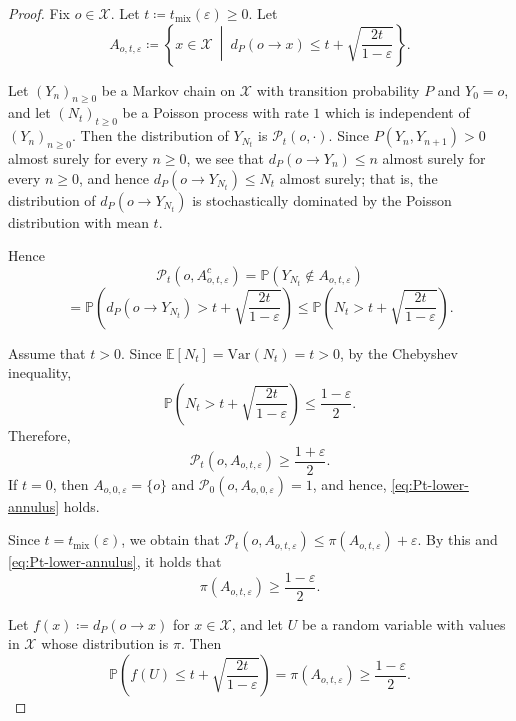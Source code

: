 \documentclass[10pt,a4paper]{amsart}
\theoremstyle{plain}
\theoremstyle{definition}
\begin{document}
\begin{proof}
Fix $o \in \mathcal{X}$. 
Let $t \coloneqq t_{\mathrm{mix}}(\varepsilon) \ge 0$. 
Let
\[ A_{o,t,\varepsilon} \coloneqq \left\{x\in\mathcal{X}\ \middle|\ d_P (o \to x) \le t+\sqrt{\frac{2t}{1-\varepsilon}}\right\}. \]

Let $(Y_n)_{n \ge 0}$ be a Markov chain on $\mathcal{X}$ with transition probability $P$ and $Y_0 = o$,
and let $(N_t)_{t \ge 0}$ be a Poisson process with rate $1$ which is independent of $(Y_n)_{n \ge 0}$.
Then the distribution of $Y_{N_t}$ is $\mathscr{P}_t (o, \cdot)$.
Since $P(Y_{n}, Y_{n+1}) > 0$ almost surely for every $n \ge 0$, we see that $d_P (o \to Y_n) \le n$ almost surely for every $n \ge 0$,
and hence $d_P (o \to Y_{N_t}) \le N_t$ almost surely;
that is, the distribution of $d_P (o \to Y_{N_t})$ is stochastically dominated by the Poisson distribution with mean $t$.

Hence
\[ \mathscr{P}_t\left(o, A_{o,t,\varepsilon}^c\right) = \mathbb{P} \left(Y_{N_t} \notin A_{o,t,\varepsilon}\right) \]
\[ = \mathbb{P} \!\left(d_P (o \to Y_{N_t}) > t+\sqrt{\frac{2t}{1-\varepsilon}}\right) \le \mathbb{P}\!\left(N_t >  t+\sqrt{\frac{2t}{1-\varepsilon}}\right). \]

Assume that $t > 0$. 
Since $\mathbb{E}[N_t] = \mathrm{Var}(N_t) = t > 0$, by the Chebyshev inequality,
\[ \mathbb{P}\!\left(N_t > t+\sqrt{\frac{2t}{1-\varepsilon}}\right) \le  \frac{1-\varepsilon}{2}. \]
Therefore, 
\begin{equation}\label{eq:Pt-lower-annulus}
\mathscr{P}_t \left(o,A_{o,t,\varepsilon}\right)\ge \frac{1+\varepsilon}{2}. 
\end{equation}
If $t=0$, then $A_{o,0,\varepsilon} = \{o\}$ and $\mathcal P_0(o,A_{o,0,\varepsilon})=1$, and hence, \eqref{eq:Pt-lower-annulus} holds. 


Since $t = t_{\mathrm{mix}}(\varepsilon)$, we obtain that
$\mathscr{P}_t \left(o,A_{o,t,\varepsilon}\right)\le \pi(A_{o,t,\varepsilon})+\varepsilon$. 
By this and \eqref{eq:Pt-lower-annulus}, it holds that 
\[ \pi\left(A_{o,t,\varepsilon}\right) \ge \frac{1-\varepsilon}{2}.\]

Let $f(x)\coloneqq d_P (o \to x)$ for $x \in \mathcal{X}$, and let $U$ be a random variable with values in $\mathcal{X}$ whose distribution is $\pi$.
Then
\begin{equation}\label{eq:dist-half}
\mathbb{P} \left(f(U)\le t+\sqrt{\frac{2t}{1-\varepsilon}}\right) = \pi\left(A_{o,t,\varepsilon}\right) \ge \frac{1-\varepsilon}{2}.
\end{equation}


\end{proof}
\end{document}
